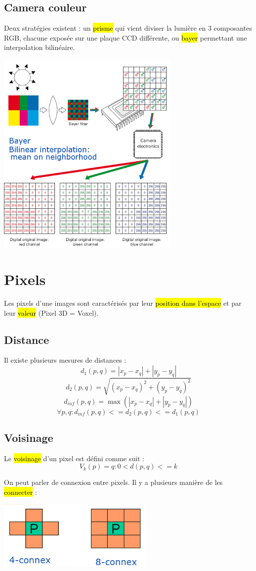 \documentclass[letterpaper, 12pt]{article}
\newcommand{\alinea}{
\hspace*{0.5cm}}
\begin{document}
	\subsection{Camera couleur}
		\alinea Deux stratégies existent : un \hl{prisme} qui vient diviser la lumière en 3 composantes RGB, chacune exposée sur une 
			plaque CCD différente, ou \hl{bayer} permettant une interpolation bilinéaire.
		\begin{center}
			\includegraphics[width=3.5in]{Images/bayer}
		\end{center}
%
\section{Pixels}
	\alinea Les pixels d'une images sont caractérisés par leur \hl{position dans l'espace} et par leur \hl{valeur}
		(Pixel 3D = Voxel).
	\subsection{Distance}
		\alinea Il existe plusieurs mesures de distances :
		$$ d_1(p, q) = |x_p - x_q| + |y_p - y_q| $$
		$$ d_2(p, q) = \sqrt{(x_p - x_q)^2 + (y_p - y_q)^2} $$
		$$ d_{inf}(p, q) = \max{(|x_p - x_q| + |y_p - y_q|)} $$
		$$ \forall p, q : d_{inf}(p, q) <= d_2(p, q) <= d_1(p, q) $$
	\subsection{Voisinage}
		\alinea Le \hl{voisinage} d'un pixel est défini comme suit :
			$$ V_k(p) = {q: 0 < d(p, q) <= k} $$
		\alinea On peut parler de connexion entre pixels. Il y a plusieurs manière de les \hl{connecter} :
			\begin{center}
				\includegraphics[width=3in]{Images/connex}
			\end{center}
\end{document}
